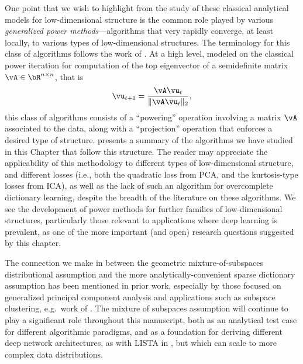 \documentclass[../../book-main.tex]{subfiles}
\begin{document}
One point that we wish to highlight from the study of these classical
analytical models for low-dimensional structure is the common role played by
various \textit{generalized power methods}---algorithms that very rapidly
converge, at
least locally, to various types of low-dimensional structures. The terminology
for this class of algorithms follows the work of \textcite{JourneeM2010}.
At a high level, modeled on the classical power iteration for computation of the top
eigenvector of a semidefinite matrix $\vA \in \bR^{n \times n}$, that is
\begin{equation}
    \vu_{t+1} = \frac{\vA \vu_{t}}{\norm{\vA \vu_{t}}_2},
\end{equation}
this class of algorithms consists of a ``powering'' operation involving a matrix
$\vA$ associated to the data, along with a ``projection'' operation that
enforces a desired type of structure.  presents
a summary of the algorithms we have studied in this Chapter that follow this
structure. The reader may appreciate the applicability of this methodology to
different types of low-dimensional structure, and different losses (i.e., both
the quadratic loss from PCA, and the kurtosis-type losses from ICA), as well as
the lack of such an algorithm for overcomplete dictionary learning, despite the
breadth of the literature on these algorithms. We see the development of power
methods for further families of low-dimensional structures, particularly those
relevant to applications where deep learning is prevalent, as one of the more
important (and open) research questions suggested by this chapter.


The connection we make in  between the
geometric mixture-of-subspaces distributional assumption and the more
analytically-convenient sparse dictionary assumption has been mentioned in prior
work, especially by those focused on generalized principal component analysis
and applications such as subspace clustering, e.g.\ work of \textcite{GPCA}.
The mixture of subspaces assumption will continue to play a significant role
throughout this manuscript, both as an analytical test case for different
algorithmic paradigms, and as a foundation for deriving different deep network
architectures, as with LISTA in , but which can scale to more
complex data distributions.
\end{document}
